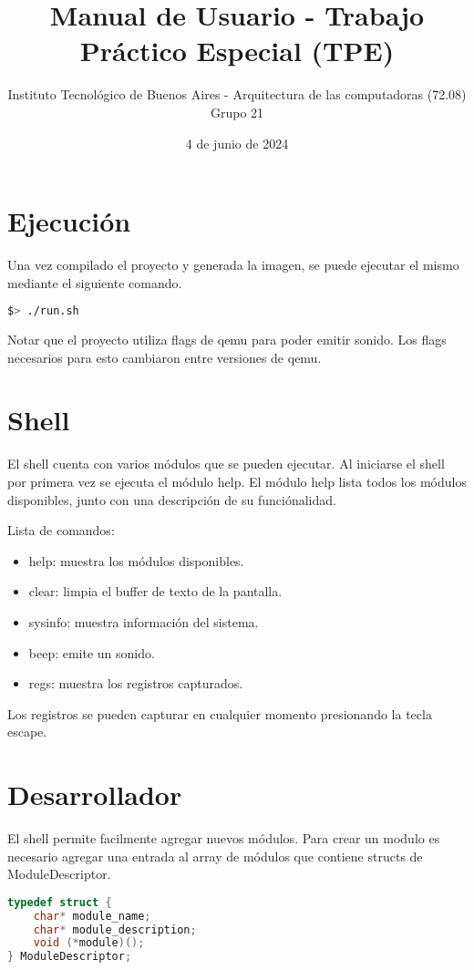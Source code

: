 \documentclass{article}
\title{\textbf{Manual de Usuario - Trabajo Práctico Especial (TPE)}}
\author{ \large Instituto Tecnológico de Buenos Aires - Arquitectura de las computadoras (72.08) \\ [1ex]
\large Grupo 21}
\date{4 de junio de 2024}
\begin{document}
\maketitle

\section *{Ejecución}

Una vez compilado el proyecto y generada la imagen, se puede ejecutar el mismo mediante el siguiente comando.

\begin{lstlisting}[language=bash]
$> ./run.sh
\end{lstlisting}

Notar que el proyecto utiliza flags de qemu para poder emitir sonido. Los flags necesarios para esto cambiaron entre versiones de qemu.

\section *{Shell}

El shell cuenta con varios módulos que se pueden ejecutar. Al iniciarse el shell por primera vez se ejecuta el módulo help. El módulo help lista todos los módulos disponibles, junto con una descripción de su funciónalidad.

Lista de comandos:
\begin{itemize}
\item help: muestra los módulos disponibles.
\item clear: limpia el buffer de texto de la pantalla.
\item sysinfo: muestra información del sistema.
\item beep: emite un sonido.
\item regs: muestra los registros capturados.
\end{itemize}
Los registros se pueden capturar en cualquier momento presionando la tecla escape.

\section *{Desarrollador}

El shell permite facilmente agregar nuevos módulos. Para crear un modulo es necesario agregar una entrada al array de módulos que contiene structs de ModuleDescriptor.

\begin{lstlisting}[language=C]
typedef struct {
    char* module_name;
    char* module_description;
    void (*module)();
} ModuleDescriptor;
\end{lstlisting}
\end{document}
